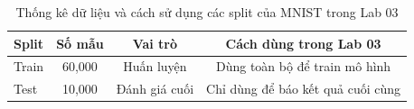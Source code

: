 \begin{table}[H]
  \centering
  \caption{Thống kê dữ liệu và cách sử dụng các split của MNIST trong Lab 03}
  \label{tab:mnist-problem-setup}
  \begin{tabular}{lccc}
    \toprule
    \textbf{Split} & \textbf{Số mẫu} & \textbf{Vai trò} & \textbf{Cách dùng trong Lab 03} \\
    \midrule
    Train & 60{,}000 & Huấn luyện & Dùng toàn bộ để train mô hình \\
    Test & 10{,}000 & Đánh giá cuối & Chỉ dùng để báo kết quả cuối cùng \\
    \bottomrule
  \end{tabular}
\end{table}

